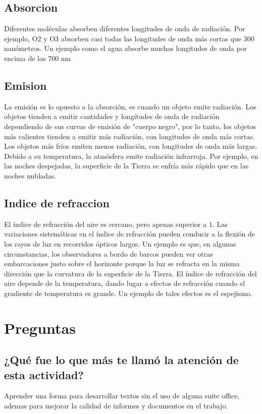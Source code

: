 \documentclass{article}
\begin{document}
\subsection{Absorcion}
Diferentes moléculas absorben diferentes longitudes de onda de radiación. Por ejemplo, O2 y O3 absorben casi todas las longitudes de onda más cortas que 300 nanómetros. Un ejemplo como el agua absorbe muchas longitudes de onda por encima de los 700 nm
\subsection{Emision}
La emisión es lo opuesto a la absorción, es cuando un objeto emite radiación. Los objetos tienden a emitir cantidades y longitudes de onda de radiación dependiendo de sus curvas de emisión de "cuerpo negro", por lo tanto, los objetos más calientes tienden a emitir más radiación, con longitudes de onda más cortas. Los objetos más fríos emiten menos radiación, con longitudes de onda más largas. Debido a su temperatura, la atmósfera emite radiación infrarroja. Por ejemplo, en las noches despejadas, la superficie de la Tierra se enfría más rápido que en las noches nubladas.
\subsection{Indice de refraccion}

El índice de refracción del aire es cercano, pero apenas superior a 1. Las variaciones sistemáticas en el índice de refracción pueden conducir a la flexión de los rayos de luz en recorridos ópticos largos. Un ejemplo es que, en algunas circunstancias, los observadores a bordo de barcos pueden ver otras embarcaciones justo sobre el horizonte porque la luz se refracta en la misma dirección que la curvatura de la superficie de la Tierra. El índice de refracción del aire depende de la temperatura, dando lugar a efectos de refracción cuando el gradiente de temperatura es grande. Un ejemplo de tales efectos es el espejismo.
\section{Preguntas}
\subsection{¿Qué fue lo que más te llamó la atención de esta actividad?}
Aprender una forma para desarrollar textos sin el uso de alguna suite office, ademas para mejorar la calidad de informes y documentos en el trabajo.
\end{document}
